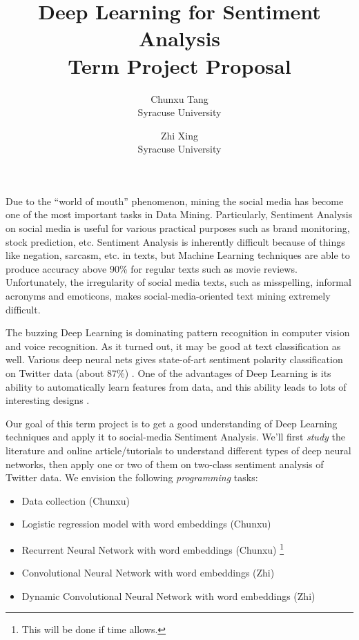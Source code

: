 \documentclass[11pt, letterpaper]{article}
\begin{document}
\title{Deep Learning for Sentiment Analysis\\
Term Project Proposal}
\author{Chunxu Tang\\ 
Syracuse University
\and
Zhi Xing\\ 
Syracuse University}
\date{}
\maketitle

Due to the ``world of mouth'' phenomenon, mining the social media has become one of the most important tasks in Data Mining. Particularly, Sentiment Analysis on social media is useful for various practical purposes such as brand monitoring, stock prediction, etc. 
Sentiment Analysis is inherently difficult because of things like negation, sarcasm, etc. in texts, but Machine Learning techniques are able to produce accuracy above 90\% for regular texts such as movie reviews. Unfortunately, the irregularity of social media texts, such as misspelling, informal acronyms and emoticons, makes social-media-oriented text mining extremely difficult. 

The buzzing Deep Learning is dominating pattern recognition in computer vision and voice recognition. As it turned out, it may be good at text classification as well. Various deep neural nets gives state-of-art sentiment polarity classification on Twitter data (about 87\%) \cite{kalchbrenner2014, kim2014, wang2015}. One of the advantages of Deep Learning is its ability to automatically learn features from data, and this ability leads to lots of interesting designs \cite{dos2014, kalchbrenner2014, kim2014, socher2013, wang2015}.

Our goal of this term project is to get a good understanding of Deep Learning techniques and apply it to social-media Sentiment Analysis. We'll first {\em study} the literature and online article/tutorials to understand different types of deep neural networks, then apply one or two of them on two-class sentiment analysis of Twitter data. We envision the following {\em programming} tasks:
\begin{itemize}
\item Data collection (Chunxu)
\item Logistic regression model with word embeddings (Chunxu)
\item Recurrent Neural Network with word embeddings (Chunxu) \footnote{\label{ext}This will be done if time allows.}
\item Convolutional Neural Network with word embeddings (Zhi)
\item Dynamic Convolutional Neural Network with word embeddings (Zhi) 
\end{itemize}

\nocite{*}
{\fontsize{9pt}{10pt}\selectfont


}
\end{document}
